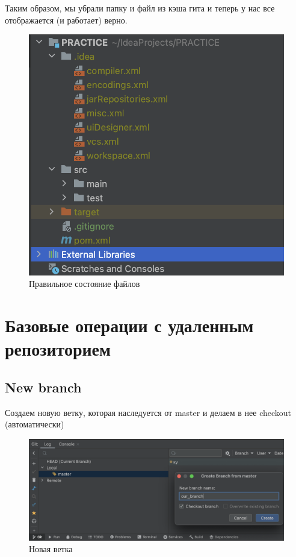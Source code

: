 \documentclass[12pt, a4paper]{article}
\begin{document}
    Таким образом, мы убрали папку и файл из кэша гита и теперь у нас все отображается (и работает) верно.

    \begin{figure}[H]
        \centering
        \includegraphics[width=0.75\linewidth]{src/untrack.png}
        \caption{Правильное состояние файлов}
    \end{figure}

    \newpage
    \section{Базовые операции с удаленным репозиторием}

    \subsection{New branch}

    Создаем новую ветку, которая наследуется от master и делаем в нее checkout (автоматически)

    \begin{figure}[H]
        \centering
        \includegraphics[width=0.75\linewidth]{src/newbranch.png}
        \caption{Новая ветка}
    \end{figure}
\end{document}

